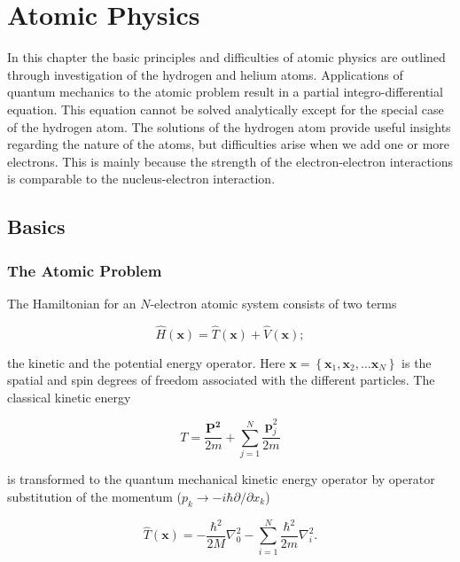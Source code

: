 \chapter{Atomic Physics}
\label{AtomicPhysics}


In this chapter the basic principles and difficulties of atomic
physics are outlined through investigation of the hydrogen and helium
atoms. Applications of quantum mechanics to the atomic problem result in
a partial integro-differential equation. This equation cannot be
solved analytically except for the special case of the hydrogen
atom. The solutions of the hydrogen atom provide useful insights
regarding the nature of the atoms, but difficulties arise when we add
one or more electrons. This is mainly because the strength of the
electron-electron interactions is comparable to the nucleus-electron
interaction.

\section{Basics}

\subsection{The Atomic Problem}
\label{TheAtomicProblem}

The Hamiltonian for an $N$-electron atomic system consists of two terms

\begin{equation}
  \hat{H}(\mathbf{x}) 
  = \hat{T}(\mathbf{x}) 
  + \hat{V}(\mathbf{x}); 
\label{hamiltonOperatorFull}
\end{equation}

the kinetic and the potential energy operator. Here $\mathbf{x} =
\left\{ \mathbf{x}_1, \mathbf{x}_2, \dots \mathbf{x}_N \right\}$  is
the spatial and spin degrees of freedom associated with the different
particles. The classical kinetic energy  

\begin{equation*}
  T= \frac{\mathbf{P^2}}{2m} + \sum_{j=1}^N \frac{\mathbf{p}_j^2}{2m}
\end{equation*}

is transformed to the quantum mechanical kinetic energy operator by 
operator substitution of the momentum ($p_k \to -i\hbar
\partial/\partial x_k$)

\begin{equation}
  \hat{T}(\mathbf{x}) = -\frac{\hbar^2}{2M}\nabla^2_0
  -\sum_{i=1}^{N}\frac{\hbar^2}{2m}\nabla^2_i.
\label{kineticEnergyOperatorFull}
\end{equation}

